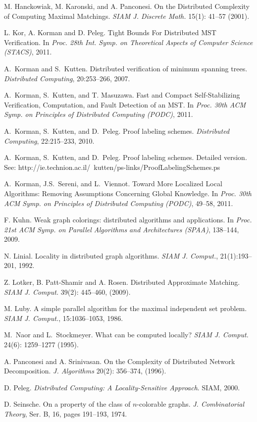 \documentclass{llncs}
\begin{document}
\begin{thebibliography}{99}
M. Hanckowiak, M. Karonski, and A. Panconesi.
\newblock  On the Distributed Complexity of Computing Maximal Matchings.
\newblock \emph{SIAM J. Discrete Math.} 15(1): 41--57 (2001).

L. Kor, A. Korman and D. Peleg.
\newblock  Tight Bounds For Distributed MST Verification.
\newblock In \emph{Proc. 28th Int. Symp. on Theoretical Aspects of
Computer Science (STACS)}, 2011.

A.~Korman and S.~Kutten.
\newblock Distributed verification of minimum spanning trees.
\newblock \emph{Distributed Computing}, 20:253--266, 2007.

A.~Korman,  S.~Kutten, and T. Masuzawa.
\newblock Fast and Compact Self-Stabilizing  Verification, Computation, and Fault Detection of an MST.
\newblock In \emph{Proc. 30th ACM Symp. on Principles of Distributed Computing (PODC)}, 2011.

A.~Korman, S.~Kutten, and D.~Peleg.
\newblock Proof labeling schemes.
\newblock \emph{Distributed Computing}, 22:215--233, 2010.

A.~Korman, S.~Kutten, and D.~Peleg.
\newblock Proof labeling schemes.
\newblock Detailed version. See: http://ie.technion.ac.il/~kutten/ps-links/ProofLabelingSchemes.ps

A.~Korman, J.S.~Sereni, and L.~Viennot.
\newblock
Toward More Localized Local Algorithms: Removing Assumptions Concerning Global Knowledge.
\newblock In \emph{Proc. 30th ACM Symp. on Principles of Distributed Computing (PODC)}, 49--58, 2011.

F. Kuhn.
\newblock Weak graph colorings: distributed algorithms and applications.
\newblock In \emph{Proc. 21st ACM Symp. on Parallel Algorithms and Architectures
(SPAA)}, 138--144, 2009.

N. Linial.
\newblock Locality in distributed graph algorithms.
\newblock \emph{SIAM J.  Comput.}, 21(1):193--201, 1992.

Z. Lotker, B. Patt-Shamir and A. Rosen.
\newblock Distributed Approximate Matching.
\newblock \emph{SIAM J. Comput.} 39(2): 445--460, (2009).

M. Luby.
\newblock A simple parallel algorithm for the maximal independent set problem.
\newblock \emph{SIAM J.  Comput.}, 15:1036--1053, 1986.

M.~Naor and L.~Stockmeyer.
\newblock What can be computed locally?
\newblock \emph{SIAM J. Comput.} 24(6): 1259--1277 (1995).

A. Panconesi and A. Srinivasan.
On the Complexity of Distributed Network Decomposition.
\newblock \emph{J. Algorithms} 20(2): 356--374, (1996).

D. Peleg.
\newblock \emph{Distributed Computing: A Locality-Sensitive Approach}.
\newblock SIAM, 2000.

D. Seinsche.
\newblock On a property of the class of $n$-colorable graphs.
\newblock \emph{J. Combinatorial Theory}, Ser. B, 16,  pages 191--193, 1974.

\end{thebibliography}
\end{document}

